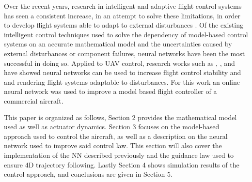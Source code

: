 Over the recent years, research in intelligent and adaptive flight control systems has seen a consistent increase, in an attempt to solve these limitations, in order to develop flight systems able to adapt to external disturbances \cite{SotA_IFCS}. Of the existing intelligent control techniques used to solve the dependency of model-based control systems on an accurate mathematical model and the uncertainties caused by external disturbances or component failures, neural networks have been the most successful in doing so. Applied to UAV control, research works such as \cite{online_adaptiveNN}, \cite{UAV_adaptive}, \cite{UAV_adaptive2} and \cite{quad_NLI+NN} have showed neural networks can be used to increase flight control stability and and rendering flight systems adaptable to disturbances. For this work an online neural network was used to improve a model based flight controller of a commercial aircraft. 

This paper is organized as follows, Section 2  provides the mathematical model used as well as actuator dynamics. Section 3 focuses on the model-based approach used to control the aircraft, as well as a description on the neural network used to improve said control law. This section will also cover the implementation of the NN described previously and the guidance law used to ensure 4D trajectory following. Lastly Section 4 shows simulation results of the control approach, and conclusions are given in Section 5.